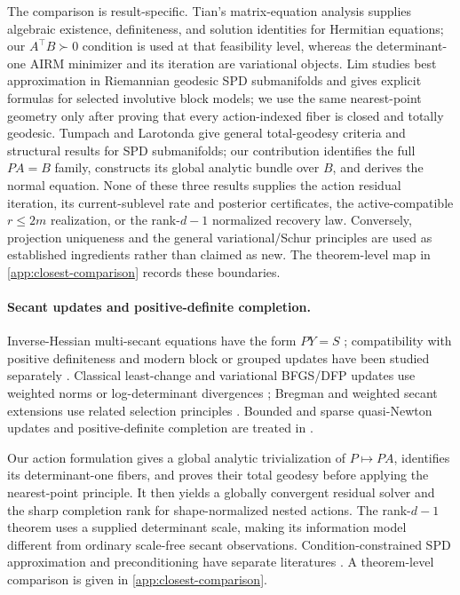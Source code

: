 The comparison is result-specific.  Tian's matrix-equation analysis supplies
algebraic existence, definiteness, and solution identities for Hermitian
equations; our \(A^\top B\succ0\) condition is used at that feasibility level,
whereas the determinant-one AIRM minimizer and its iteration are variational
objects.  Lim studies best approximation in Riemannian geodesic SPD
submanifolds and gives explicit formulas for selected involutive block models;
we use the same nearest-point geometry only after proving that every
action-indexed fiber is closed and totally geodesic.  Tumpach and Larotonda
give general total-geodesy criteria and structural results for SPD
submanifolds; our contribution identifies the full \(PA=B\) family, constructs
its global analytic bundle over \(B\), and derives the normal equation.  None
of these three results supplies the action residual iteration, its
current-sublevel rate and posterior certificates, the active-compatible
\(r\le2m\) realization, or the rank-\(d-1\) normalized recovery law.  Conversely,
projection uniqueness and the general variational/Schur principles are used as
established ingredients rather than claimed as new.  The theorem-level map in
\cref{app:closest-comparison} records these boundaries.

\paragraph{Secant updates and positive-definite completion.}
Inverse-Hessian multi-secant equations have the form \(PY=S\)
\cite{schnabel1983multiple}; compatibility with positive definiteness and
modern block or grouped updates have been studied separately
\cite{passy1984secant,gao2018block,boutet2022grouped}.  Classical least-change
and variational BFGS/DFP updates use weighted norms or log-determinant
divergences \cite{dennis1979leastchange,fletcher1991variational}; Bregman and
weighted secant extensions use related selection principles
\cite{kanamori2013bregman,gratton2015weighted}.  Bounded and sparse
quasi-Newton updates and positive-definite completion are treated in
\cite{calamai1987bounds,yamashita2007sparse,dai2014sparse,grone1984positive}.

Our action formulation gives a global analytic trivialization of
\(P\mapsto PA\), identifies its determinant-one fibers, and proves their total
geodesy before applying the nearest-point principle.  It then yields a
globally convergent residual solver and the sharp completion rank for
shape-normalized nested actions.  The rank-\(d-1\) theorem uses a supplied
determinant scale, making its information model different from ordinary
scale-free secant observations.  Condition-constrained SPD approximation and
preconditioning have separate literatures
\cite{tanaka2014condition,marechal2009optimizing,lu2011minimizing,
gao2023scalable,qu2024optimal,dogan2025geodesicpreconditioning}.  A
theorem-level comparison is given in \cref{app:closest-comparison}.


